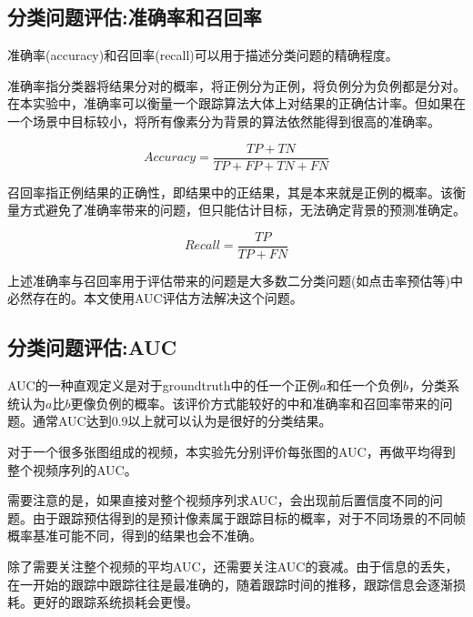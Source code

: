 \subsection{分类问题评估:准确率和召回率}
准确率(accuracy)和召回率(recall)可以用于描述分类问题的精确程度。
\par
准确率指分类器将结果分对的概率，将正例分为正例，将负例分为负例都是分对。在本实验中，准确率可以衡量一个跟踪算法大体上对结果的正确估计率。但如果在一个场景中目标较小，将所有像素分为背景的算法依然能得到很高的准确率。
\par
\begin{equation}\label{equ:accuracy}  Accuracy=\frac{TP+TN}{TP+FP+TN+FN}  \end{equation}
\par
召回率指正例结果的正确性，即结果中的正结果，其是本来就是正例的概率。该衡量方式避免了准确率带来的问题，但只能估计目标，无法确定背景的预测准确定。
\par
\begin{equation}\label{equ:recall}  Recall=\frac{TP}{TP+FN}  \end{equation}
\par
上述准确率与召回率用于评估带来的问题是大多数二分类问题(如点击率预估等)中必然存在的。本文使用AUC评估方法解决这个问题。

\subsection{分类问题评估:AUC} \label{section:auc}
AUC的一种直观定义是对于groundtruth中的任一个正例$a$和任一个负例$b$，分类系统认为$a$比$b$更像负例的概率。该评价方式能较好的中和准确率和召回率带来的问题。通常AUC达到0.9以上就可以认为是很好的分类结果。
\par
对于一个很多张图组成的视频，本实验先分别评价每张图的AUC，再做平均得到整个视频序列的AUC。
\par
需要注意的是，如果直接对整个视频序列求AUC，会出现前后置信度不同的问题。由于跟踪预估得到的是预计像素属于跟踪目标的概率，对于不同场景的不同帧概率基准可能不同，得到的结果也会不准确。
\par
除了需要关注整个视频的平均AUC，还需要关注AUC的衰减。由于信息的丢失，在一开始的跟踪中跟踪往往是最准确的，随着跟踪时间的推移，跟踪信息会逐渐损耗。更好的跟踪系统损耗会更慢。



